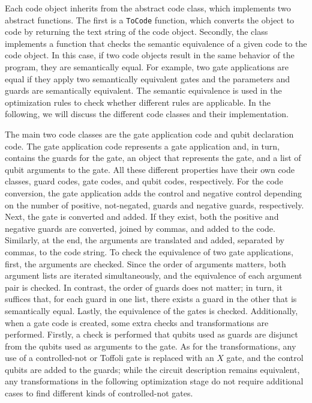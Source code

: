 Each code object inherits from the abstract code class, which implements two abstract functions. The first is a \texttt{ToCode} function, which converts the object to code by returning the text string of the code object. Secondly, the class implements a function that checks the semantic equivalence of a given code to the code object. In this case, if two code objects result in the same behavior of the program, they are semantically equal. For example, two gate applications are equal if they apply two semantically equivalent gates and the parameters and guards are semantically equivalent. The semantic equivalence is used in the optimization rules to check whether different rules are applicable. In the following, we will discuss the different code classes and their implementation. 

The main two code classes are the gate application code and qubit declaration code. The gate application code represents a gate application and, in turn, contains the guards for the gate, an object that represents the gate, and a list of qubit arguments to the gate. All these different properties have their own code classes, guard codes, gate codes, and qubit codes, respectively. For the code conversion, the gate application adds the control and negative control depending on the number of positive, \ie not-negated, guards and negative guards, respectively. Next, the gate is converted and added. If they exist, both the positive and negative guards are converted, joined by commas, and added to the code. Similarly, at the end, the arguments are translated and added, separated by commas, to the code string. To check the equivalence of two gate applications, first, the arguments are checked. 
Since the order of arguments matters, both argument lists are iterated simultaneously, and the equivalence of each argument pair is checked. In contrast, the order of guards does not matter; in turn, it suffices that, for each guard in one list, there exists a guard in the other that is semantically equal. Lastly, the equivalence of the gates is checked. 
Additionally, when a gate code is created, some extra checks and transformations are performed. Firstly, a check is performed that qubits used as guards are disjunct from the qubits used as arguments to the gate. As for the transformations, any use of a controlled-not or Toffoli gate is replaced with an $X$ gate, and the control qubits are added to the guards; while the circuit description remains equivalent, any transformations in the following optimization stage do not require additional cases to find different kinds of controlled-not gates.


